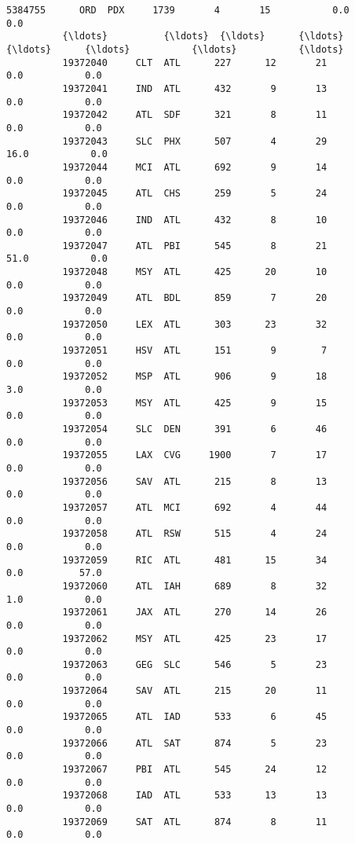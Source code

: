 \documentclass[11pt]{article}
\begin{document}
\begin{Verbatim}[commandchars=\\\{\}]
          5384755      ORD  PDX     1739       4       15           0.0           0.0   
          {\ldots}          {\ldots}  {\ldots}      {\ldots}     {\ldots}      {\ldots}           {\ldots}           {\ldots}   
          19372040     CLT  ATL      227      12       21           0.0           0.0   
          19372041     IND  ATL      432       9       13           0.0           0.0   
          19372042     ATL  SDF      321       8       11           0.0           0.0   
          19372043     SLC  PHX      507       4       29          16.0           0.0   
          19372044     MCI  ATL      692       9       14           0.0           0.0   
          19372045     ATL  CHS      259       5       24           0.0           0.0   
          19372046     IND  ATL      432       8       10           0.0           0.0   
          19372047     ATL  PBI      545       8       21          51.0           0.0   
          19372048     MSY  ATL      425      20       10           0.0           0.0   
          19372049     ATL  BDL      859       7       20           0.0           0.0   
          19372050     LEX  ATL      303      23       32           0.0           0.0   
          19372051     HSV  ATL      151       9        7           0.0           0.0   
          19372052     MSP  ATL      906       9       18           3.0           0.0   
          19372053     MSY  ATL      425       9       15           0.0           0.0   
          19372054     SLC  DEN      391       6       46           0.0           0.0   
          19372055     LAX  CVG     1900       7       17           0.0           0.0   
          19372056     SAV  ATL      215       8       13           0.0           0.0   
          19372057     ATL  MCI      692       4       44           0.0           0.0   
          19372058     ATL  RSW      515       4       24           0.0           0.0   
          19372059     RIC  ATL      481      15       34           0.0          57.0   
          19372060     ATL  IAH      689       8       32           1.0           0.0   
          19372061     JAX  ATL      270      14       26           0.0           0.0   
          19372062     MSY  ATL      425      23       17           0.0           0.0   
          19372063     GEG  SLC      546       5       23           0.0           0.0   
          19372064     SAV  ATL      215      20       11           0.0           0.0   
          19372065     ATL  IAD      533       6       45           0.0           0.0   
          19372066     ATL  SAT      874       5       23           0.0           0.0   
          19372067     PBI  ATL      545      24       12           0.0           0.0   
          19372068     IAD  ATL      533      13       13           0.0           0.0   
          19372069     SAT  ATL      874       8       11           0.0           0.0   
          

\end{Verbatim}
\end{document}
